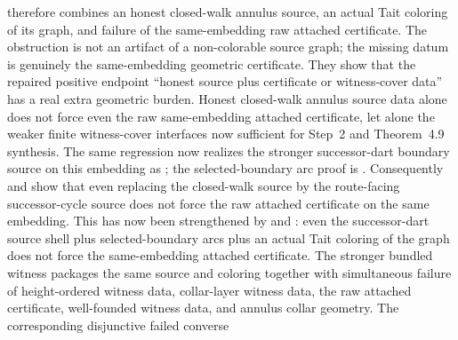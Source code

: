 \documentclass[11pt]{article}
\begin{document}
therefore combines an honest closed-walk annulus source, an actual Tait
coloring of its graph, and failure of the same-embedding raw attached
certificate.  The obstruction is not an artifact of a non-colorable source
graph; the missing datum is genuinely the same-embedding geometric
certificate.
They show
that the repaired positive endpoint ``honest source plus certificate or
witness-cover data'' has a real extra geometric burden.  Honest closed-walk
annulus source data alone does not force even the raw same-embedding attached
certificate, let alone the weaker finite witness-cover interfaces now sufficient
for Step~2 and Theorem~4.9 synthesis.  The same regression now realizes the
stronger successor-dart boundary source on this embedding as
; the selected-boundary arc
proof is
.
Consequently
and
show that even replacing the closed-walk source by the route-facing
successor-cycle source does not force the raw attached certificate on the same
embedding.  This has now been strengthened by
and
:
even the successor-dart source shell plus selected-boundary arcs plus an
actual Tait coloring of the graph does not force the same-embedding attached
certificate.  The stronger bundled witness
packages the same source and coloring together with simultaneous failure of
height-ordered witness data, collar-layer witness data, the raw attached
certificate, well-founded witness data, and annulus collar geometry.  The
corresponding disjunctive failed converse
\end{document}
